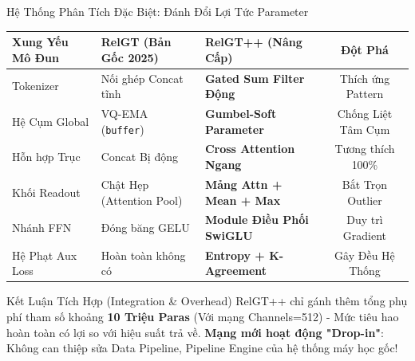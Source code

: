 \documentclass[aspectratio=169,11pt]{beamer}
\begin{document}
\begin{frame}{Hệ Thống Phân Tích Đặc Biệt: Đánh Đổi Lợi Tức Parameter}
\begin{center}
\small
\begin{tabular}{@{}l l l c@{}}
\toprule
\textbf{Xung Yếu Mô Đun} & \textbf{RelGT (Bản Gốc 2025)} & \textbf{RelGT++ (Nâng Cấp)} & \textbf{Đột Phá}\\
\midrule
Tokenizer       & Nối ghép Concat tĩnh   & \color{accentgreen}\textbf{Gated Sum Filter Động} & Thích ứng Pattern \\[3pt]
Hệ Cụm Global        & VQ-EMA (\texttt{buffer}) & \color{accentgreen}\textbf{Gumbel-Soft Parameter} & Chống Liệt Tâm Cụm \\[3pt]
Hỗn hợp Trục    & Concat Bị động         & \color{accentgreen}\textbf{Cross Attention Ngang} & Tương thích 100\%\\[3pt]
Khối Readout         & Chật Hẹp (Attention Pool)     & \color{accentgreen}\textbf{Mảng Attn + Mean + Max} & Bắt Trọn Outlier \\[3pt]
Nhánh FFN             & Đóng băng GELU              & \color{accentgreen}\textbf{Module Điều Phối SwiGLU} & Duy trì Gradient\\[3pt]
Hệ Phạt Aux Loss    & Hoàn toàn không có               & \color{accentgreen}\textbf{Entropy + K-Agreement} & Gây Đều Hệ Thống \\
\bottomrule
\end{tabular}
\end{center}

\vspace{5pt}
\begin{alertblock}{Kết Luận Tích Hợp (Integration \& Overhead)}
RelGT++ chỉ gánh thêm tổng phụ phí tham số khoảng \textbf{10 Triệu Paras} (Với mạng Channels=512) - Mức tiêu hao hoàn toàn có lợi so với hiệu suất trả về. \textbf{Mạng mới hoạt động "Drop-in"}: Không can thiệp sửa Data Pipeline, Pipeline Engine của hệ thống máy học gốc!
\end{alertblock}
\end{frame}

\end{document}
